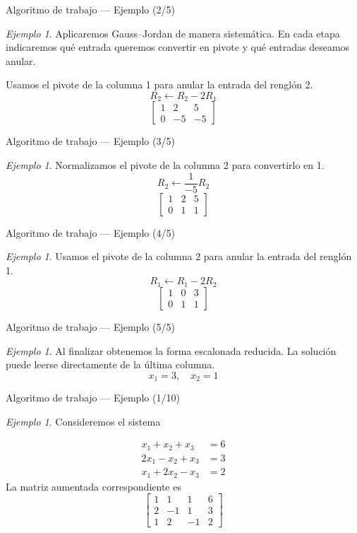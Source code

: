 \documentclass[aspectratio=169,11pt]{beamer}
\theoremstyle{remark}
\newtheorem{Ejem}[definicion]{Ejemplo}
\begin{document}
\begin{frame}{Algoritmo de trabajo — Ejemplo (2/5)}
\begin{Ejem}
Aplicaremos Gauss--Jordan de manera sistemática. En cada etapa indicaremos qué entrada queremos convertir en pivote y qué entradas deseamos anular.


Usamos el pivote de la columna 1 para anular la entrada del renglón 2.
\[
R_{2}\leftarrow R_{2}-2R_{1}
\]
\[
\left[\begin{array}{cc|c}
1 & 2 & 5\\
0 & -5 & -5
\end{array}\right]
\]
\end{Ejem}
\end{frame}

\begin{frame}{Algoritmo de trabajo — Ejemplo (3/5)}
\begin{Ejem}
Normalizamos el pivote de la columna 2 para convertirlo en 1.
\[
R_{2}\leftarrow \frac{1}{-5}R_{2}
\]
\[
\left[\begin{array}{cc|c}
1 & 2 & 5\\
0 & 1 & 1
\end{array}\right]
\]
\end{Ejem}
\end{frame}

\begin{frame}{Algoritmo de trabajo — Ejemplo (4/5)}
\begin{Ejem}
Usamos el pivote de la columna 2 para anular la entrada del renglón 1.
\[
R_{1}\leftarrow R_{1}-2R_{2}
\]
\[
\left[\begin{array}{cc|c}
1 & 0 & 3\\
0 & 1 & 1
\end{array}\right]
\]
\end{Ejem}
\end{frame}

\begin{frame}{Algoritmo de trabajo — Ejemplo (5/5)}
\begin{Ejem}
Al finalizar obtenemos la forma escalonada reducida. La solución puede leerse directamente de la última columna.
\[
\boxed{x_{1}=3,\quad x_{2}=1}
\]
\end{Ejem}
\end{frame}

\begin{frame}{Algoritmo de trabajo — Ejemplo (1/10)}
\begin{Ejem}
Consideremos el sistema

\[
\begin{aligned}
x_{1} + x_{2} + x_{3} &= 6\\
2 x_{1} - x_{2} + x_{3} &= 3\\
x_{1} + 2 x_{2} - x_{3} &= 2
\end{aligned}
\]
La matriz aumentada correspondiente es
\[
\left[\begin{array}{ccc|c}
1 & 1 & 1 & 6\\
2 & -1 & 1 & 3\\
1 & 2 & -1 & 2
\end{array}\right]
\]
\end{Ejem}
\end{frame}
\end{document}
